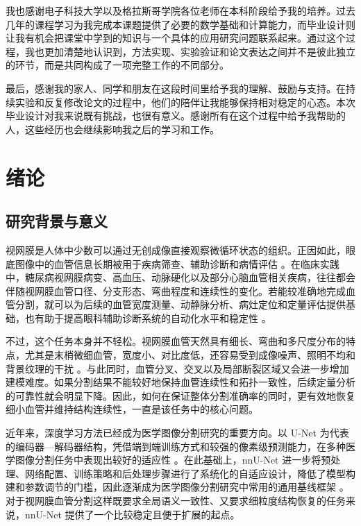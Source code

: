 \documentclass[a4paper,12pt]{article}
\begin{document}
我也感谢电子科技大学以及格拉斯哥学院各位老师在本科阶段给予我的培养。过去几年的课程学习为我完成本课题提供了必要的数学基础和计算能力，而毕业设计则让我有机会把课堂中学到的知识与一个具体的应用研究问题联系起来。通过这个过程，我也更加清楚地认识到，方法实现、实验验证和论文表达之间并不是彼此独立的环节，而是共同构成了一项完整工作的不同部分。

最后，感谢我的家人、同学和朋友在这段时间里给予我的理解、鼓励与支持。在持续实验和反复修改论文的过程中，他们的陪伴让我能够保持相对稳定的心态。本次毕业设计对我来说既有挑战，也很有意义。感谢所有在这个过程中给予我帮助的人，这些经历也会继续影响我之后的学习和工作。

\tableofcontents
\clearpage

\section{绪论}

\subsection{研究背景与意义}
视网膜是人体中少数可以通过无创成像直接观察微循环状态的组织。正因如此，眼底图像中的血管信息长期被用于疾病筛查、辅助诊断和病情评估 \cite{staal2004drive,hoover2000locating}。在临床实践中，糖尿病视网膜病变、高血压、动脉硬化以及部分心脑血管相关疾病，往往都会伴随视网膜血管口径、分支形态、弯曲程度和连续性的变化。若能较准确地完成血管分割，就可以为后续的血管宽度测量、动静脉分析、病灶定位和定量评估提供基础，也有助于提高眼科辅助诊断系统的自动化水平和稳定性 \cite{fraz2012ensemble,budai2013robust}。

不过，这个任务本身并不轻松。视网膜血管天然具有细长、弯曲和多尺度分布的特点，尤其是末梢微细血管，宽度小、对比度低，还容易受到成像噪声、照明不均和背景纹理的干扰 \cite{staal2004drive,hoover2000locating}。与此同时，血管分叉、交叉以及局部断裂区域又会进一步增加建模难度。如果分割结果不能较好地保持血管连续性和拓扑一致性，后续定量分析的可靠性就会明显下降。因此，如何在保证整体分割准确率的同时，更有效地恢复细小血管并维持结构连续性，一直是该任务中的核心问题。

近年来，深度学习方法已经成为医学图像分割研究的重要方向。以 U-Net 为代表的编码器—解码器结构，凭借端到端训练方式和较强的像素级预测能力，在多种医学图像分割任务中表现出较好的适应性 \cite{ronneberger2015unet,cicek2016unet3d,milletari2016vnet}。在此基础上，nnU-Net 进一步将预处理、网络配置、训练策略和后处理步骤进行了系统化的自适应设计，降低了模型构建和参数调节的门槛，因此逐渐成为医学图像分割研究中常用的通用基线框架 \cite{isensee2021nnunet}。对于视网膜血管分割这样既要求全局语义一致性、又要求细粒度结构恢复的任务来说，nnU-Net 提供了一个比较稳定且便于扩展的起点。
\end{document}
